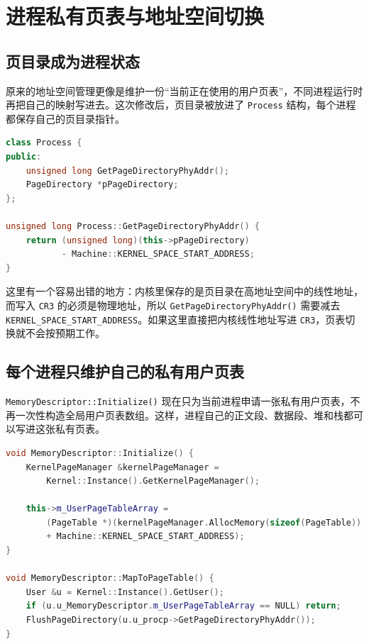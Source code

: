 \chapter{进程私有页表与地址空间切换}\label{chap:process-page-table}

\section{页目录成为进程状态}

原来的地址空间管理更像是维护一份“当前正在使用的用户页表”，不同进程运行时再把自己的映射写进去。这次修改后，页目录被放进了 \texttt{Process} 结构，每个进程都保存自己的页目录指针。

\begin{lstlisting}[language=C++,caption={进程保存自己的页目录},label={lst:process-pgd}]
class Process {
public:
    unsigned long GetPageDirectoryPhyAddr();
    PageDirectory *pPageDirectory;
};

unsigned long Process::GetPageDirectoryPhyAddr() {
    return (unsigned long)(this->pPageDirectory)
           - Machine::KERNEL_SPACE_START_ADDRESS;
}
\end{lstlisting}

这里有一个容易出错的地方：内核里保存的是页目录在高地址空间中的线性地址，而写入 \texttt{CR3} 的必须是物理地址，所以 \texttt{GetPageDirectoryPhyAddr()} 需要减去 \texttt{KERNEL\_SPACE\_START\_ADDRESS}。如果这里直接把内核线性地址写进 \texttt{CR3}，页表切换就不会按预期工作。

\section{每个进程只维护自己的私有用户页表}

\texttt{MemoryDescriptor::Initialize()} 现在只为当前进程申请一张私有用户页表，不再一次性构造全局用户页表数组。这样，进程自己的正文段、数据段、堆和栈都可以写进这张私有页表。

\begin{lstlisting}[language=C++,caption={为进程分配私有用户页表},label={lst:private-pt}]
void MemoryDescriptor::Initialize() {
    KernelPageManager &kernelPageManager =
        Kernel::Instance().GetKernelPageManager();

    this->m_UserPageTableArray =
        (PageTable *)(kernelPageManager.AllocMemory(sizeof(PageTable))
        + Machine::KERNEL_SPACE_START_ADDRESS);
}

void MemoryDescriptor::MapToPageTable() {
    User &u = Kernel::Instance().GetUser();
    if (u.u_MemoryDescriptor.m_UserPageTableArray == NULL) return;
    FlushPageDirectory(u.u_procp->GetPageDirectoryPhyAddr());
}
\end{lstlisting}

